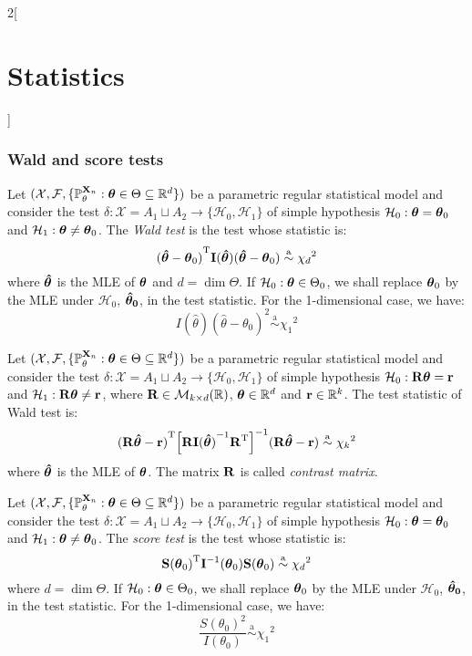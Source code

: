 \documentclass[../../../main.tex]{subfiles}
\begin{document}
\begin{multicols}{2}[\section{Statistics}]
  \subsubsection{Wald and score tests}
  \begin{definition}
    Let $(\mathcal{X},\mathcal{F},\{\mathbb{P}_\theta^{\boldsymbol{\mathrm{X}}_n}:\boldsymbol{\mathrm{\theta}}\in\Theta\subseteq\mathbb{R}^d\})$ be a parametric regular statistical model and consider the test $\delta:\mathcal{X}=A_1\sqcup A_2\rightarrow\{\mathcal{H}_0,\mathcal{H}_1\}$ of simple hypothesis $\mathcal{H}_0:\boldsymbol{\mathrm{\theta}}=\boldsymbol{\mathrm{\theta}}_0$ and $\mathcal{H}_1:\boldsymbol{\mathrm{\theta}}\ne\boldsymbol{\mathrm{\theta}}_0$. The \emph{Wald test} is the test whose statistic is: $${(\boldsymbol{\mathrm{\hat\theta}}-\boldsymbol{\mathrm{\theta}}_0)}^{\mathrm{T}}\boldsymbol{\mathrm{I}}(\boldsymbol{\mathrm{\hat\theta}})(\boldsymbol{\mathrm{\hat\theta}}-\boldsymbol{\mathrm{\theta}}_0)\overset{\text{a}}{\sim}{\chi_d}^2$$ where $\boldsymbol{\mathrm{\hat\theta}}$ is the MLE of $\boldsymbol{\mathrm{\theta}}$ and $d=\dim\Theta$. If $\mathcal{H}_0:\boldsymbol{\mathrm{\theta}}\in\Theta_0$, we shall replace $\boldsymbol{\mathrm{\theta}}_0$ by the MLE under $\mathcal{H}_0$, $\boldsymbol{\mathrm{\hat\theta_0}}$, in the test statistic. For the 1-dimensional case, we have: $$I(\hat\theta){(\hat\theta-\theta_0)}^2\overset{\text{a}}{\sim}{\chi_1}^2$$
  \end{definition}
  \begin{corollary}
    Let $(\mathcal{X},\mathcal{F},\{\mathbb{P}_\theta^{\boldsymbol{\mathrm{X}}_n}:\boldsymbol{\mathrm{\theta}}\in\Theta\subseteq\mathbb{R}^d\})$ be a parametric regular statistical model and consider the test $\delta:\mathcal{X}=A_1\sqcup A_2\rightarrow\{\mathcal{H}_0,\mathcal{H}_1\}$ of simple hypothesis $\mathcal{H}_0:\boldsymbol{\mathrm{R}}\boldsymbol{\mathrm{\theta}}=\boldsymbol{\mathrm{r}}$ and $\mathcal{H}_1:\boldsymbol{\mathrm{R}}\boldsymbol{\mathrm{\theta}}\ne\boldsymbol{\mathrm{r}}$, where $\boldsymbol{\mathrm{R}}\in\mathcal{M}_{k\times d}(\mathbb{R})$, $\boldsymbol{\mathrm{\theta}}\in\mathbb{R}^d$ and $\boldsymbol{\mathrm{r}}\in\mathbb{R}^k$. The test statistic of Wald test is: $${(\boldsymbol{\mathrm{R\hat\theta}}-\boldsymbol{\mathrm{r}})}^{\mathrm{T}}{\left[\boldsymbol{\mathrm{R}}{\boldsymbol{\mathrm{I}}(\boldsymbol{\mathrm{\hat\theta}})}^{-1}{\boldsymbol{\mathrm{R}}}^{\mathrm{T}}\right]}^{-1}(\boldsymbol{\mathrm{R\hat\theta}}-\boldsymbol{\mathrm{r}})\overset{\text{a}}{\sim}{\chi_k}^2$$ where $\boldsymbol{\mathrm{\hat\theta}}$ is the MLE of $\boldsymbol{\mathrm{\theta}}$. The matrix $\boldsymbol{\mathrm{R}}$ is called \emph{contrast matrix}.
  \end{corollary}
  \begin{definition}
    Let $(\mathcal{X},\mathcal{F},\{\mathbb{P}_\theta^{\boldsymbol{\mathrm{X}}_n}:\boldsymbol{\mathrm{\theta}}\in\Theta\subseteq\mathbb{R}^d\})$ be a parametric regular statistical model and consider the test $\delta:\mathcal{X}=A_1\sqcup A_2\rightarrow\{\mathcal{H}_0,\mathcal{H}_1\}$ of simple hypothesis $\mathcal{H}_0:\boldsymbol{\mathrm{\theta}}=\boldsymbol{\mathrm{\theta}}_0$ and $\mathcal{H}_1:\boldsymbol{\mathrm{\theta}}\ne\boldsymbol{\mathrm{\theta}}_0$. The \emph{score test} is the test whose statistic is: $${\boldsymbol{\mathrm{S}}(\boldsymbol{\mathrm{\theta}}_0)}^{\mathrm{T}}\boldsymbol{\mathrm{I}}^{-1}(\boldsymbol{\mathrm{\theta}}_0)\boldsymbol{\mathrm{S}}(\boldsymbol{\mathrm{\theta}}_0)\overset{\text{a}}{\sim}{\chi_d}^2$$ where $d=\dim\Theta$. If $\mathcal{H}_0:\boldsymbol{\mathrm{\theta}}\in\Theta_0$, we shall replace $\boldsymbol{\mathrm{\theta}}_0$ by the MLE under $\mathcal{H}_0$, $\boldsymbol{\mathrm{\hat\theta_0}}$, in the test statistic. For the 1-dimensional case, we have: $$\frac{{S(\theta_0)}^2}{I(\theta_0)}\overset{\text{a}}{\sim}{\chi_1}^2$$
  \end{definition}

\end{multicols}
\end{document}
